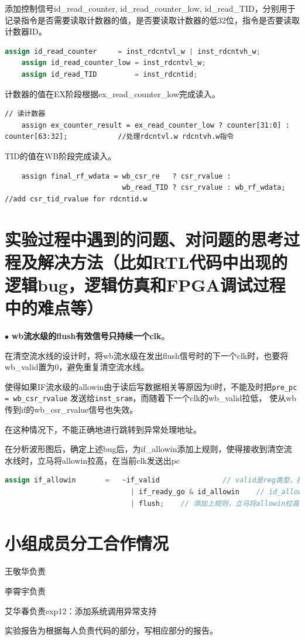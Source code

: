 \documentclass[11pt]{article}
\begin{document}
\begin{enumerate}
添加控制信号id\_read\_counter, id\_read\_counter\_low, id\_read\_TID，分别用于记录指令是否需要读取计数器的值，是否要读取计数器的低32位，指令是否要读取计数器ID。
\begin{lstlisting}[language=verilog]
    assign id_read_counter     = inst_rdcntvl_w | inst_rdcntvh_w;
    assign id_read_counter_low = inst_rdcntvl_w;
    assign id_read_TID         = inst_rdcntid; 
\end{lstlisting}
计数器的值在EX阶段根据ex\_read\_counter\_low完成读入。
\begin{lstlisting}
// 读计数器
    assign ex_counter_result = ex_read_counter_low ? counter[31:0] : counter[63:32];            //处理rdcntvl.w rdcntvh.w指令
\end{lstlisting}
TID的值在WB阶段完成读入。
\begin{lstlisting}
    assign final_rf_wdata = wb_csr_re   ? csr_rvalue : 
                            wb_read_TID ? csr_rvalue : wb_rf_wdata;             //add csr_tid_rvalue for rdcntid.w
\end{lstlisting}

\end{enumerate}


\vspace{1ex}

\section{实验过程中遇到的问题、对问题的思考过程及解决方法（比如RTL代码中出现的逻辑bug，逻辑仿真和FPGA调试过程中的难点等）}

\noindent
$\bullet$
\textbf{wb流水级的flush有效信号只持续一个clk}。

在清空流水线的设计时，将wb流水级在发出flush信号时的下一个clk时，也要将wb\_valid置为0，避免重复清空流水线。

使得如果IF流水级的allowin由于读后写数据相关等原因为0时，不能及时把\verb|pre_pc = wb_csr_rvalue| 发送给\verb|inst_sram|，而随着下一个clk的wb\_valid拉低，
使从wb传到if的wb\_csr\_rvalue信号也失效。

在这种情况下，不能正确地进行跳转到异常处理地址。

在分析波形图后，确定上述bug后，为if\_allowin添加上规则，使得接收到清空流水线时，立马将allowin拉高，在当前clk发送出pc

\begin{lstlisting}[language=verilog]
  assign if_allowin       =   ~if_valid               // valid是reg类型，接受flush后最快下一个clk才能拉低
                              | if_ready_go & id_allowin    // id_allowin可能由于读后写阻塞，拉低
                              | flush;    // 添加上规则，立马将allowin拉高，在当前clk发送出pc
\end{lstlisting}



\vspace{1ex}

\section{小组成员分工合作情况}
王敬华负责

李霄宇负责

艾华春负责exp12：添加系统调用异常支持

实验报告为根据每人负责代码的部分，写相应部分的报告。
\end{document}
